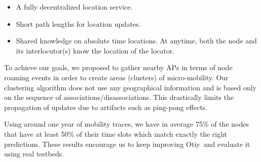 \documentclass[a4paper]{sig-alternate-10pt}
\newcommand{\otiy}{{\sffamily Otiy}}
\begin{document}
\begin{itemize}

\item A fully decentralized location service.

\item Short path lengths for location updates.

\item Shared knowledge on absolute time locations. At anytime, both
the node and its interlocutor(s) know the location of the
locator.

\end{itemize}

To achieve our goals, we proposed to gather nearby APs in terms of
node roaming events in order to create areas (clusters) of
micro-mobility. Our clustering algorithm does not use any
geographical information and is based only on the sequence of
associations/dis\-associa\-tions. This drastically limits the 
propagation of updates due to artifacts such as ping-pong effects.

Using around one year of mobility traces, we have in average 75\% 
of the nodes that have at least 50\% of their time slots which match
exactly the right predictions. These results encourage us to keep
improving \otiy\ and evaluate it using real testbeds.



\end{document}

